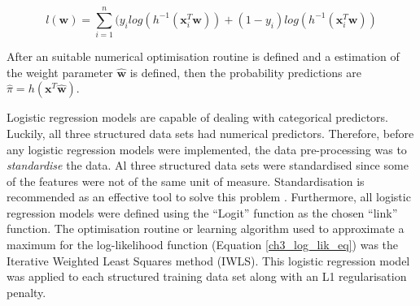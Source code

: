 \begin{equation}
    l(\boldsymbol{w}) = \sum_{i=1}^{n}(y_ilog(h^{-1}(\boldsymbol{x}_i^T\boldsymbol{w})) + (1-y_i)log(h^{-1}(\boldsymbol{x}_i^T\boldsymbol{w}))
\label{ch3_log_lik_eq}
\end{equation} 
 
After an suitable numerical optimisation routine is defined and a estimation of the weight parameter $\boldsymbol{\hat{w}}$ is defined, then the probability predictions are $\hat{\pi} = h(\boldsymbol{x}^T\hat{\boldsymbol{w}})$.

Logistic regression models are capable of dealing with categorical predictors. Luckily, all three structured data sets had numerical predictors. Therefore, before any logistic regression models were implemented, the data pre-processing was to \textit{standardise} the data. Al three structured data sets were standardised since some of the features were not of the same unit of measure. Standardisation is recommended as an effective tool to solve this problem \citep{james2013introduction}. Furthermore, all logistic regression models were defined using the ``Logit'' function as the chosen ``link'' function. The optimisation routine or learning algorithm used to approximate a maximum for the log-likelihood function (Equation \ref{ch3_log_lik_eq}) was the Iterative Weighted Least Squares method (IWLS). This logistic regression model was applied to each structured training data set along with an L1 regularisation penalty. 

